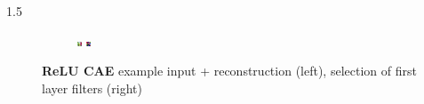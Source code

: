 \documentclass[final]{beamer}
\newlength{\onecolwid}
\newlength{\threecolwid}
\begin{document}
\begin{frame}[t]
\begin{columns}[t]
\begin{column}{\threecolwid}
\begin{alertblock}
\begin{columns}[t]
\begin{column}{1.5\onecolwid}
\begin{figure}
\begin{subfigure}{0.4\linewidth}
					\includegraphics[width=0.1\linewidth]{graphics/reconstructions/cifar/relu/relu_filter_07.png} \hspace{0.05\linewidth}
					\includegraphics[width=0.1\linewidth]{graphics/reconstructions/cifar/relu/relu_filter_08.png} 


				\end{subfigure}

			\caption{\textbf{ReLU CAE} example input + reconstruction (left), selection of first layer filters (right) }
			\label{fig:relu_cae}

			\end{figure}
		
		\end{column}



\end{columns}

\end{alertblock}


\end{column}
\end{columns} %


\end{frame} %
\end{document}
